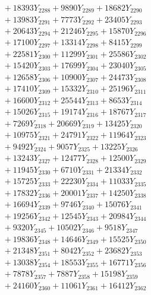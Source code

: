 \documentclass[a4paper,10pt]{article}
\begin{document}
{\begin{align}
&\;  + 18393 Y_{2288} + 9890 Y_{2289} + 18682 Y_{2290} \\[0.3ex]
&\;  + 13983 Y_{2291} + 7773 Y_{2292} + 23405 Y_{2293} \\[0.3ex]
&\;  + 20643 Y_{2294} + 21246 Y_{2295} + 15870 Y_{2296} \\[0.3ex]
&\;  + 17100 Y_{2297} + 13314 Y_{2298} + 8415 Y_{2299} \\[0.3ex]
&\;  + 22581 Y_{2300} + 11299 Y_{2301} + 25586 Y_{2302} \\[0.3ex]
&\;  + 15420 Y_{2303} + 17699 Y_{2304} + 23040 Y_{2305} \\[0.3ex]
&\;  + 12658 Y_{2306} + 10900 Y_{2307} + 24473 Y_{2308} \\[0.5ex]\allowbreak
&\;  + 17410 Y_{2309} + 15332 Y_{2310} + 25196 Y_{2311} \\[0.3ex]
&\;  + 16600 Y_{2312} + 25544 Y_{2313} + 8653 Y_{2314} \\[0.3ex]
&\;  + 15026 Y_{2315} + 19174 Y_{2316} + 18767 Y_{2317} \\[0.3ex]
&\;  + 7269 Y_{2318} + 20669 Y_{2319} + 13425 Y_{2320} \\[0.3ex]
&\;  + 10975 Y_{2321} + 24791 Y_{2322} + 11964 Y_{2323} \\[0.3ex]
&\;  + 9492 Y_{2324} + 9057 Y_{2325} + 13225 Y_{2326} \\[0.3ex]
&\;  + 13243 Y_{2327} + 12477 Y_{2328} + 12500 Y_{2329} \\[0.3ex]
&\;  + 11945 Y_{2330} + 6710 Y_{2331} + 21334 Y_{2332} \\[0.3ex]
&\;  + 15725 Y_{2333} + 22230 Y_{2334} + 11033 Y_{2335} \\[0.3ex]
&\;  + 17832 Y_{2336} + 20001 Y_{2337} + 14250 Y_{2338} \\[0.5ex]\allowbreak
&\;  + 16694 Y_{2339} + 9746 Y_{2340} + 15076 Y_{2341} \\[0.3ex]
&\;  + 19256 Y_{2342} + 12545 Y_{2343} + 20984 Y_{2344} \\[0.3ex]
&\;  + 9320 Y_{2345} + 10502 Y_{2346} + 9518 Y_{2347} \\[0.3ex]
&\;  + 19836 Y_{2348} + 14646 Y_{2349} + 15525 Y_{2350} \\[0.3ex]
&\;  + 21348 Y_{2351} + 8042 Y_{2352} + 23682 Y_{2353} \\[0.3ex]
&\;  + 13038 Y_{2354} + 18553 Y_{2355} + 16771 Y_{2356} \\[0.3ex]
&\;  + 7878 Y_{2357} + 7887 Y_{2358} + 15198 Y_{2359} \\[0.3ex]
&\;  + 24160 Y_{2360} + 11061 Y_{2361} + 16412 Y_{2362} \\[0.3ex]

\end{align}}
\end{document}
